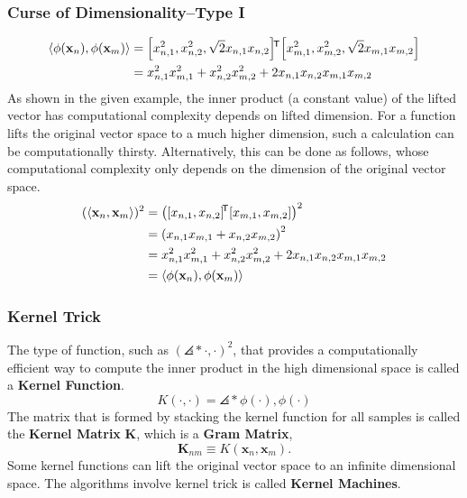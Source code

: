 \documentclass[10pt]{../Formats/RU}
\begin{document}
\begin{frame}
\frametitle{Curse of Dimensionality--Type I}
  \begin{align*}
    \angles*{\phi(\mathbf{x}_n), \phi(\mathbf{x}_m)}
    &= \bracks*{x_{n,1}^2 , x_{n,2}^2 , \sqrt{2}x_{n,1}x_{n,2}}\trn\bracks*{x_{m,1}^2 , x_{m,2}^2 , \sqrt{2}x_{m,1}x_{m,2}} \\
    &= x_{n,1}^2x_{m,1}^2 + x_{n,2}^2x_{m,2}^2 + 2x_{n,1}x_{n,2}x_{m,1}x_{m,2}
  \end{align*}
As shown in the given example, the inner product (a constant value) of the lifted vector has computational complexity depends on lifted dimension. For a function lifts the original vector space to a much higher dimension, such a calculation can be computationally thirsty. Alternatively, this can be done as follows, whose computational complexity only depends on the dimension of the original vector space.
  \begin{align*}
    (\angles*{\mathbf{x}_n, \mathbf{x}_m})^2
    &= \parens*{\bracks*{x_{n,1} , x_{n,2}}\trn\bracks*{x_{m,1} , x_{m,2}}}^2 \\
    &= \parens*{x_{n,1}x_{m,1} + x_{n,2}x_{m,2}}^2 \\
    &= x_{n,1}^2x_{m,1}^2 + x_{n,2}^2x_{m,2}^2 + 2x_{n,1}x_{n,2}x_{m,1}x_{m,2} \\
    &= \angles*{\phi(\mathbf{x}_n), \phi(\mathbf{x}_m)}
  \end{align*}
\end{frame}
\begin{frame}
  \frametitle{Kernel Trick}
  The type of function, such as $(\angles*{\cdot, \cdot})^2$, that provides a computationally efficient way to compute the inner product in the high dimensional space is called a \textbf{Kernel Function}.
  \[
    K(\cdot,\cdot) = \angles*{\phi(\cdot),\phi(\cdot)}
  \]
  The matrix that is formed by stacking the kernel function for all samples is called the \textbf{Kernel Matrix} $\mathbf{K}$, which is a \textbf{Gram Matrix},
  \[
    \mathbf{K}_{nm} \equiv K(\mathbf{x}_n, \mathbf{x}_m).
  \]
  Some kernel functions can lift the original vector space to an infinite dimensional space.
  The algorithms involve kernel trick is called \textbf{Kernel Machines}.
\end{frame}
\end{document}
